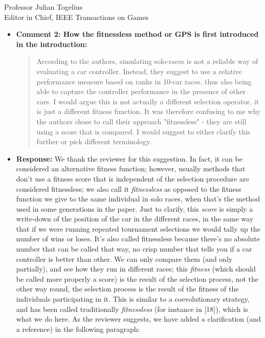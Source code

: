 \documentclass[10pt]{letter} %
\begin{document}
\begin{letter}{Professor Julian Togelius \\ Editor in Chief, IEEE Transactions on Games}
\begin{enumerate}
\begin{itemize}
		\item {\bf  Comment 2:  How the fitnessless method or GPS is first introduced in the introduction:\\
			                \begin{quote}
				According to the authors, simulating solo-races is
				not a reliable way of evaluating a car
				controller. Instead, they suggest to use a relative
				performance measure based on ranks in 10-car races,
				thus also being able to capture the controller
				performance in the presence of other cars. I would
				argue this is not actually a different selection
				operator, it is just a different fitness function. It
				was therefore confusing to me why the authors chose
				to call their approach "fitnessless" - they are still
				using a score that is compared. I would suggest to
				either clarify this further or pick different
				terminology.
			\end{quote}}
			\item {\bf Response:}
		We thank the reviewer for this suggestion. In fact, it can be
		considered an alternative fitness function; however, usually methods that don't use a fitness score that is independent of the selection procedure are considered fitnessless; we also call it {\em fitnessless} as opposed to the fitness function we give to the same individual in solo races, when that's the method used in some generations in the paper. Just to clarify, this {\em score} is simply a write-down of the position of the car in the different races, in the
		same way that if we were running repeated tournament selections we would tally up the number of wins or loses. It's also called fitnessless because there's no absolute number that can be called that way, no crisp number that tells you if a car controller is better than other. We can only compare them (and only partially), and see how they
		run in different races; this {\em fitness} (which should be called more properly a score) is the result of the selection process, not the other way round, the selection process is the result of the fitness of the individuals participating in it. This is similar to a coevolutionary strategy, and has been called traditionally {\em fitnessless} (for instance in [18]), which is what we do here.
		As the reviewer suggests, we have added a clarification (and a
		reference) in the following paragraph:\\

\end{itemize}
\end{enumerate}
\end{letter}
\end{document}
